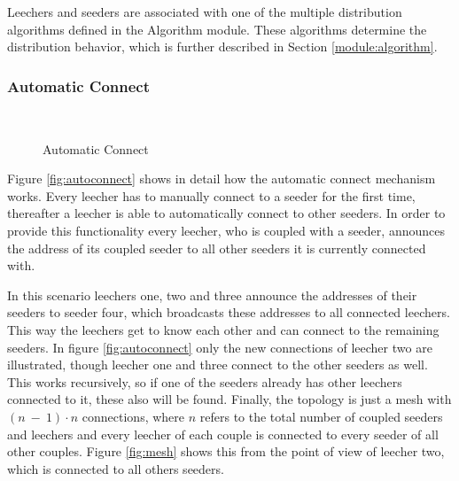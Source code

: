 Leechers and seeders are associated with one of the multiple distribution algorithms defined in the Algorithm module. These algorithms determine the distribution behavior, which is further described in Section \ref{module:algorithm}.

\subsubsection{Automatic Connect}
\label{module:core:net:autoconnect}

\begin{figure}[ht]
	\begin{center}

		~ %

		\caption{Automatic Connect}
	\end{center}
\end{figure}


Figure \ref{fig:autoconnect} shows in detail how the automatic connect mechanism works. Every leecher has to manually connect to a seeder for the first time, thereafter a leecher is able to automatically connect to other seeders. In order to provide this functionality every leecher, who is coupled with a seeder, announces the address of its coupled seeder to all other seeders it is currently connected with.

In this scenario leechers one, two and three announce the addresses of their seeders to seeder four, which broadcasts these addresses to all connected leechers. This way the leechers get to know each other and can connect to the remaining seeders. In figure \ref{fig:autoconnect} only the new connections of leecher two are illustrated, though leecher one and three connect to the other seeders as well. This works recursively, so if one of the seeders already has other leechers connected to it, these also will be found. Finally, the topology is just a mesh with $(n\:-\:1)\cdot n$ connections, where $n$ refers to the total number of coupled seeders and leechers and every leecher of each couple is connected to every seeder of all other couples. Figure \ref{fig:mesh} shows this from the point of view of leecher two, which is connected to all others seeders.

